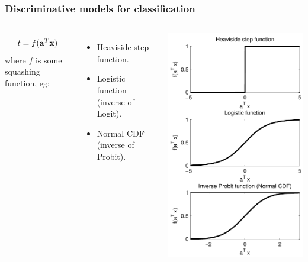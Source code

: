\begin{frame}
\frametitle{Discriminative models for classification}
\begin{columns}[c]
\begin{align*}
t = f({\bf a}^T {\bf x})
\end{align*}
where $f$ is some squashing function, eg:
\begin{itemize}
\item Heaviside step function.
\item Logistic function (inverse of Logit).
\item Normal CDF (inverse of Probit).
\end{itemize}
\includegraphics[width=.75\textwidth]{squashing}
\end{columns}
\end{frame}

